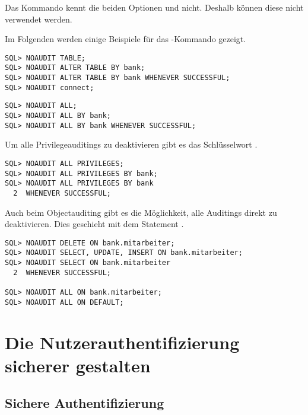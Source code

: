         \begin{merke}
          Das Kommando  kennt die beiden Optionen  und  nicht. Deshalb können diese nicht verwendet werden.
        \end{merke}
        Im Folgenden werden einige Beispiele für das -Kommando gezeigt.
\clearpage
        \begin{lstlisting}[caption={Statement- und Privilegeauditing deaktivieren},label=admin818,language=oracle_sql]
SQL> NOAUDIT TABLE;
SQL> NOAUDIT ALTER TABLE BY bank;
SQL> NOAUDIT ALTER TABLE BY bank WHENEVER SUCCESSFUL;
SQL> NOAUDIT connect;
        \end{lstlisting}
        \begin{lstlisting}[caption={Alle AUDIT ALL-Statements
        deaktivieren},label=admin819,language=oracle_sql]
SQL> NOAUDIT ALL;
SQL> NOAUDIT ALL BY bank;
SQL> NOAUDIT ALL BY bank WHENEVER SUCCESSFUL;
        \end{lstlisting}
        \begin{merke}
          Um alle Privilegeauditings zu deaktivieren gibt es das Schlüsselwort .
        \end{merke}
        \begin{lstlisting}[caption={Alle Privilegeauditings deaktivieren},label=admin820,language=oracle_sql]
SQL> NOAUDIT ALL PRIVILEGES;
SQL> NOAUDIT ALL PRIVILEGES BY bank;
SQL> NOAUDIT ALL PRIVILEGES BY bank
  2  WHENEVER SUCCESSFUL;
        \end{lstlisting}
        Auch beim Objectauditing gibt es die Möglichkeit, alle Auditings direkt zu deaktivieren. Dies geschieht mit dem Statement .
        \begin{lstlisting}[caption={Objectauditing deaktivieren},label=admin821,language=oracle_sql]
SQL> NOAUDIT DELETE ON bank.mitarbeiter;
SQL> NOAUDIT SELECT, UPDATE, INSERT ON bank.mitarbeiter;
SQL> NOAUDIT SELECT ON bank.mitarbeiter
  2  WHENEVER SUCCESSFUL;

SQL> NOAUDIT ALL ON bank.mitarbeiter;
SQL> NOAUDIT ALL ON DEFAULT;
        \end{lstlisting}
    \section{Die Nutzerauthentifizierung sicherer gestalten}
      \subsection{Sichere Authentifizierung}
